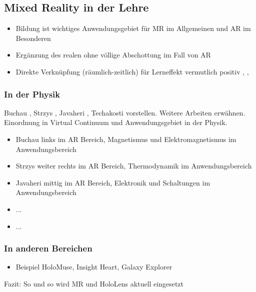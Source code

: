 \subsection{Mixed Reality in der Lehre}
\label{sec-2-2}

\begin{itemize}
	\item Bildung ist wichtiges Anwendungsgebiet für MR im Allgemeinen und AR im Besonderen
	\item Ergänzung des realen ohne völlige Abschottung im Fall von AR
	\item Direkte Verknüpfung (räumlich-zeitlich) für Lerneffekt vermutlich positiv \cite{Akcayir17}, \cite{Chen2017}, \cite{Knierim18}
\end{itemize}

\subsubsection{In der Physik}
Buchau \cite{Buchau09}, Strzys \cite{Strzys18}, Javaheri \cite{Javaheri18}, Techakosti \cite{Techakosit15} vorstellen. Weitere Arbeiten erwähnen.\\
Einordnung in Virtual Continuum und Anwendungsgebiet in der Physik.
\begin{itemize}
	\item Buchau links im AR Bereich, Magnetismus und Elektromagnetismus im Anwendungsbereich
	\item Strzys weiter rechts im AR Bereich, Thermodynamik im Anwendungsbereich
	\item Javaheri mittig im AR Bereich, Elektronik und Schaltungen im Anwendungsbereich
	\item ...
	\item ...
\end{itemize}

\subsubsection{In anderen Bereichen}
\begin{itemize}
	\item Beispiel HoloMuse, Insight Heart, Galaxy Explorer 
\end{itemize}

Fazit: So und so wird MR und HoloLens aktuell eingesetzt

